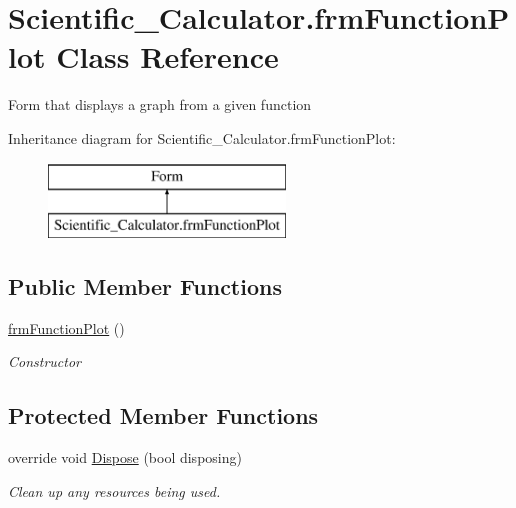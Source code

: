 \hypertarget{class_scientific___calculator_1_1frm_function_plot}{}\section{Scientific\+\_\+\+Calculator.\+frm\+Function\+Plot Class Reference}
\label{class_scientific___calculator_1_1frm_function_plot}


Form that displays a graph from a given function  


Inheritance diagram for Scientific\+\_\+\+Calculator.\+frm\+Function\+Plot\+:\begin{figure}[H]
\begin{center}
\leavevmode
\includegraphics[height=2.000000cm]{class_scientific___calculator_1_1frm_function_plot}
\end{center}
\end{figure}
\subsection*{Public Member Functions}
\begin{DoxyCompactItemize}
\item 
\hyperlink{class_scientific___calculator_1_1frm_function_plot_ae747a0991aecf3c9f82e111913248f1a}{frm\+Function\+Plot} ()
\begin{DoxyCompactList}\small\item\em Constructor \end{DoxyCompactList}\end{DoxyCompactItemize}
\subsection*{Protected Member Functions}
\begin{DoxyCompactItemize}
\item 
override void \hyperlink{class_scientific___calculator_1_1frm_function_plot_aa502a35dc8fc827e93659199df349dce}{Dispose} (bool disposing)
\begin{DoxyCompactList}\small\item\em Clean up any resources being used. \end{DoxyCompactList}\end{DoxyCompactItemize}


